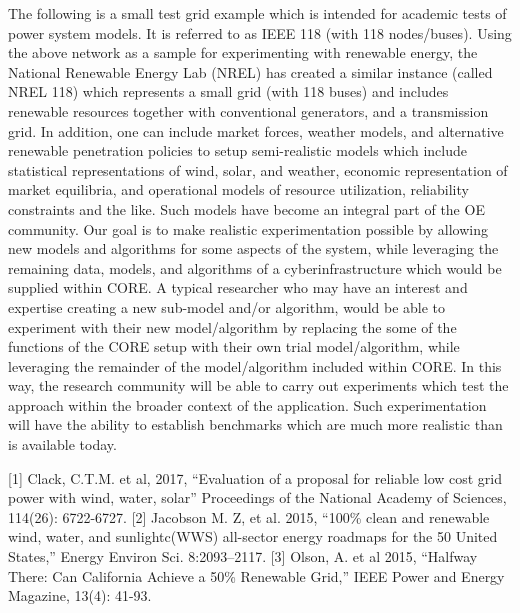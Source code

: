 \documentclass[11pt,a4paper]{article}
\begin{document}
The following is a small test grid example which is intended for academic tests of power system models. It is referred to as IEEE 118 (with 118 nodes/buses). Using the above network as a sample for experimenting with renewable energy, the National Renewable Energy Lab (NREL) has created a similar instance (called NREL 118) which represents a small grid (with 118 buses) and includes renewable resources together with conventional generators, and a transmission grid.  In addition, one can include market forces, weather models, and alternative renewable penetration policies to setup semi-realistic models which include statistical representations of wind, solar, and weather, economic representation of market equilibria, and operational models of resource utilization, reliability constraints and the like.  Such models have become an integral part of the OE community.  Our goal is to make realistic experimentation possible by allowing new models and algorithms for some aspects of the system, while leveraging the remaining data, models, and algorithms of a cyberinfrastructure which would be supplied within CORE.   A typical researcher who may  have an interest and expertise creating a new sub-model and/or algorithm, would be able to experiment with their new model/algorithm  by replacing the some of the functions of the CORE setup with their own trial  model/algorithm, while leveraging the remainder of the model/algorithm included within CORE.  In this way, the research community will be able to carry out experiments which test the approach within the broader context of the application.  Such experimentation will have the ability to establish benchmarks which are much more realistic than is available today. 

[1]	Clack, C.T.M. et al, 2017, “Evaluation of a proposal for reliable low cost grid power with wind, water, solar” Proceedings of the National Academy of Sciences, 114(26): 6722-6727.
[2]	Jacobson M. Z, et al. 2015, “100\% clean and renewable wind, water, and sunlightc(WWS) all-sector energy roadmaps for the 50 United States,”  Energy Environ Sci. 8:2093–2117.
[3]	Olson, A. et al 2015, “Halfway There:  Can California Achieve a 50\% Renewable Grid,” IEEE Power and Energy Magazine, 13(4): 41-93.
\end{document}
